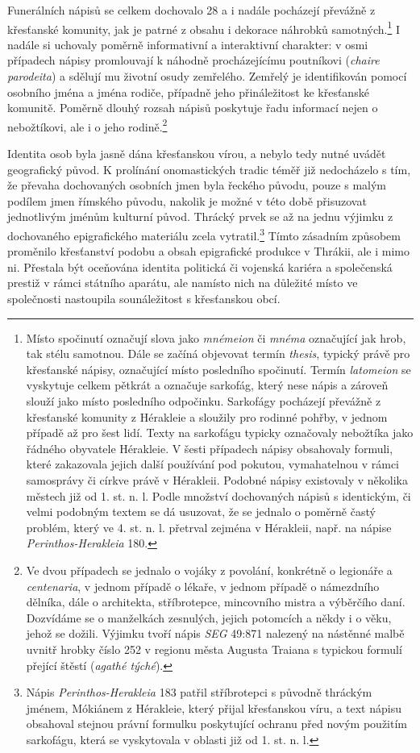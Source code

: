 Funerálních nápisů se celkem dochovalo 28 a i nadále pocházejí převážně z křesťanské komunity, jak je patrné z obsahu i dekorace náhrobků samotných.\footnote{Místo spočinutí označují slova jako {\em mnémeion} či {\em mnéma} označující jak hrob, tak stélu samotnou. Dále se začíná objevovat termín {\em thesis}, typický právě pro křesťanské nápisy, označující místo posledního spočinutí. Termín {\em latomeion} se vyskytuje celkem pětkrát a označuje sarkofág, který nese nápis a zároveň slouží jako místo posledního odpočinku. Sarkofágy pocházejí převážně z křesťanské komunity z Hérakleie a sloužily pro rodinné pohřby, v jednom případě až pro šest lidí. Texty na sarkofágu typicky označovaly nebožtíka jako řádného obyvatele Hérakleie. V šesti případech nápisy obsahovaly formuli, které zakazovala jejich další používání pod pokutou, vymahatelnou v rámci samosprávy či církve právě v Hérakleii. Podobné nápisy existovaly v několika městech již od 1. st. n. l. Podle množství dochovaných nápisů s identickým, či velmi podobným textem se dá usuzovat, že se jednalo o poměrně častý problém, který ve 4. st. n. l. přetrval zejména v Hérakleii, např. na nápise {\em Perinthos-Herakleia} 180.} I nadále si uchovaly poměrně informativní a interaktivní charakter: v osmi případech nápisy promlouvají k náhodně procházejícímu poutníkovi ({\em chaire parodeita}) a sdělují mu životní osudy zemřelého. Zemřelý je identifikován pomocí osobního jména a jména rodiče, případně jeho přináležitost ke křesťanské komunitě. Poměrně dlouhý rozsah nápisů poskytuje řadu informací nejen o nebožtíkovi, ale i o jeho rodině.\footnote{Ve dvou případech se jednalo o vojáky z povolání, konkrétně o legionáře a {\em centenaria}, v jednom případě o lékaře, v jednom případě o námezdního dělníka, dále o architekta, stříbrotepce, mincovního mistra a výběrčího daní. Dozvídáme se o manželkách zesnulých, jejich potomcích a někdy i o věku, jehož se dožili. Výjimku tvoří nápis {\em SEG} 49:871 nalezený na nástěnné malbě uvnitř hrobky číslo 252 v regionu města Augusta Traiana s typickou formulí přející štěstí ({\em agathé týché}).}

Identita osob byla jasně dána křesťanskou vírou, a nebylo tedy nutné uvádět geografický původ. K prolínání onomastických tradic téměř již nedocházelo s tím, že převaha dochovaných osobních jmen byla řeckého původu, pouze s malým podílem jmen římského původu, nakolik je možné v této době přisuzovat jednotlivým jménům kulturní původ. Thrácký prvek se až na jednu výjimku z dochovaného epigrafického materiálu zcela vytratil.\footnote{Nápis {\em Perinthos-Herakleia} 183 patřil stříbrotepci s původně thráckým jménem, Mókiánem z Hérakleie, který přijal křesťanskou víru, a text nápisu obsahoval stejnou právní formulku poskytující ochranu před novým použitím sarkofágu, která se vyskytovala v oblasti již od 1. st. n. l.} Tímto zásadním způsobem proměnilo křesťanství podobu a obsah epigrafické produkce v Thrákii, ale i mimo ni. Přestala být oceňována identita politická či vojenská kariéra a společenská prestiž v rámci státního aparátu, ale namísto nich na důležité místo ve společnosti nastoupila sounáležitost s křesťanskou obcí.


